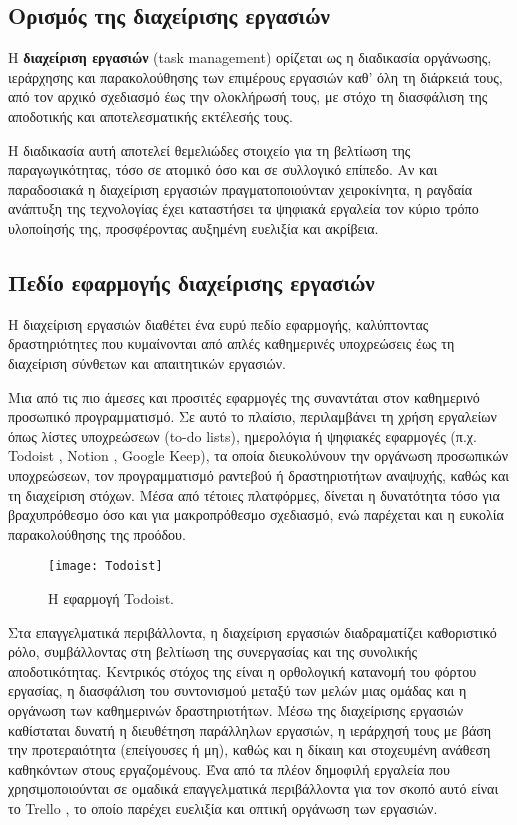         \subsection{Ορισμός της διαχείρισης εργασιών}
            Η \textbf{διαχείριση εργασιών} (task management) ορίζεται ως η διαδικασία οργάνωσης, ιεράρχησης και παρακολούθησης των επιμέρους εργασιών καθ’ όλη τη διάρκειά τους, από τον αρχικό σχεδιασμό έως την ολοκλήρωσή τους, με στόχο τη διασφάλιση της αποδοτικής και αποτελεσματικής εκτέλεσής τους.

            Η διαδικασία αυτή αποτελεί θεμελιώδες στοιχείο για τη βελτίωση της παραγωγικότητας, τόσο σε ατομικό όσο και σε συλλογικό επίπεδο. Αν και παραδοσιακά η διαχείριση εργασιών πραγματοποιούνταν χειροκίνητα, η ραγδαία ανάπτυξη της τεχνολογίας έχει καταστήσει τα ψηφιακά εργαλεία τον κύριο τρόπο υλοποίησής της, προσφέροντας αυξημένη ευελιξία και ακρίβεια.

        \subsection{Πεδίο εφαρμογής διαχείρισης εργασιών}
            Η διαχείριση εργασιών διαθέτει ένα ευρύ πεδίο εφαρμογής, καλύπτοντας δραστηριότητες που κυμαίνονται από απλές καθημερινές υποχρεώσεις έως τη διαχείριση σύνθετων και απαιτητικών εργασιών.

            Μια από τις πιο άμεσες και προσιτές εφαρμογές της συναντάται στον καθημερινό προσωπικό προγραμματισμό. Σε αυτό το πλαίσιο, περιλαμβάνει τη χρήση εργαλείων όπως λίστες υποχρεώσεων (to-do lists), ημερολόγια ή ψηφιακές εφαρμογές (π.χ. Todoist \cite{Todoist}, Notion \cite{Notion}, Google Keep), τα οποία διευκολύνουν την οργάνωση προσωπικών υποχρεώσεων, τον προγραμματισμό ραντεβού ή δραστηριοτήτων αναψυχής, καθώς και τη διαχείριση στόχων. Μέσα από τέτοιες πλατφόρμες, δίνεται η δυνατότητα τόσο για βραχυπρόθεσμο όσο και για μακροπρόθεσμο σχεδιασμό, ενώ παρέχεται και η ευκολία παρακολούθησης της προόδου.

            \begin{figure}[h!] \noindent \centering
                \texttt{[image: Todoist]}
                \caption{Η εφαρμογή Todoist.}
            \end{figure}

            Στα επαγγελματικά περιβάλλοντα, η διαχείριση εργασιών διαδραματίζει καθοριστικό ρόλο, συμβάλλοντας στη βελτίωση της συνεργασίας και της συνολικής αποδοτικότητας. Κεντρικός στόχος της είναι η ορθολογική κατανομή του φόρτου εργασίας, η διασφάλιση του συντονισμού μεταξύ των μελών μιας ομάδας και η οργάνωση των καθημερινών δραστηριοτήτων.  Μέσω της διαχείρισης εργασιών καθίσταται δυνατή η διευθέτηση παράλληλων εργασιών, η ιεράρχησή τους με βάση την προτεραιότητα (επείγουσες ή μη), καθώς και η δίκαιη και στοχευμένη ανάθεση καθηκόντων στους εργαζομένους. Ένα από τα πλέον δημοφιλή εργαλεία που χρησιμοποιούνται σε ομαδικά επαγγελματικά περιβάλλοντα για τον σκοπό αυτό είναι το Trello \cite{Trello}, το οποίο παρέχει ευελιξία και οπτική οργάνωση των εργασιών.

